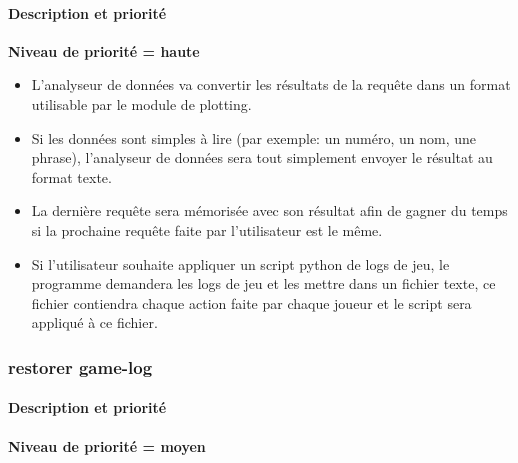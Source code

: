 \paragraph*{Description et priorité}
\textbf{Niveau de priorité = haute}\\
\begin{itemize}

\item L'analyseur de données va convertir les résultats de la requête dans un format utilisable par le module de plotting.
\item Si les données sont simples à lire (par exemple: un numéro, un nom, une phrase), l'analyseur de données sera tout simplement envoyer le résultat au format texte.
\item La dernière requête sera mémorisée avec son résultat afin de gagner du temps si la prochaine requête faite par l'utilisateur est le même.
\item Si l'utilisateur souhaite appliquer un script python de logs de jeu, le programme demandera les logs de jeu et les mettre dans un fichier texte, ce fichier contiendra chaque action faite par chaque joueur et le script sera appliqué à ce fichier.
\end{itemize}

\subsubsection{restorer game-log}
\paragraph*{Description et priorité}
\textbf{Niveau de priorité = moyen}\\

